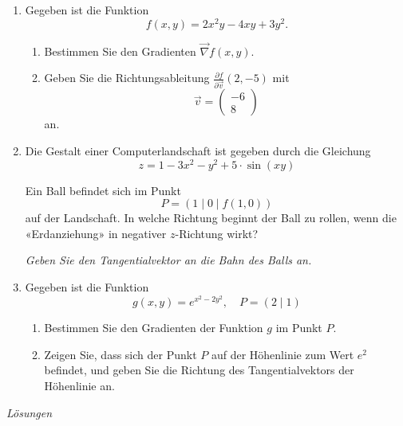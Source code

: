 \clearpage
\begin{ueb}
	{}{}

	\begin{enumerate}
		\item Gegeben ist die Funktion
		      \[
			      f(x, y) = 2x^2 y - 4xy + 3y^2.
		      \]
		      \begin{enumerate}
			      \item Bestimmen Sie den Gradienten \( \vec{\nabla} f(x, y) \).
			      \item Geben Sie die Richtungsableitung \(\frac{\partial f}{\partial \vec{v}}(2, -5) \) mit
			            \[
				            \vec{v} = \begin{pmatrix} -6 \\ 8 \end{pmatrix}
			            \]
			            an.
		      \end{enumerate}

		\item Die Gestalt einer Computerlandschaft ist gegeben durch die Gleichung
		      \[
			      z = 1 - 3x^2 - y^2 + 5 \cdot \sin(xy)
		      \]

		      Ein Ball befindet sich im Punkt
		      \[
			      P = (1 \mid 0 \mid f(1, 0))
		      \]
		      auf der Landschaft. In welche Richtung beginnt der Ball zu rollen, wenn die «Erdanziehung» in negativer \( z \)-Richtung wirkt?

		      \textit{Geben Sie den Tangentialvektor an die Bahn des Balls an.}


		\item Gegeben ist die Funktion
		      \[
			      g(x, y) = e^{x^2 - 2y^2}, \quad P = (2 \mid 1)
		      \]
		      \begin{enumerate}
			      \item Bestimmen Sie den Gradienten der Funktion \( g \) im Punkt \( P \).
			      \item Zeigen Sie, dass sich der Punkt \( P \) auf der Höhenlinie zum Wert \( e^2 \) befindet, und geben Sie die Richtung des Tangentialvektors der Höhenlinie an.
		      \end{enumerate}
	\end{enumerate}

\end{ueb}
\clearpage
\emph{Lösungen}


